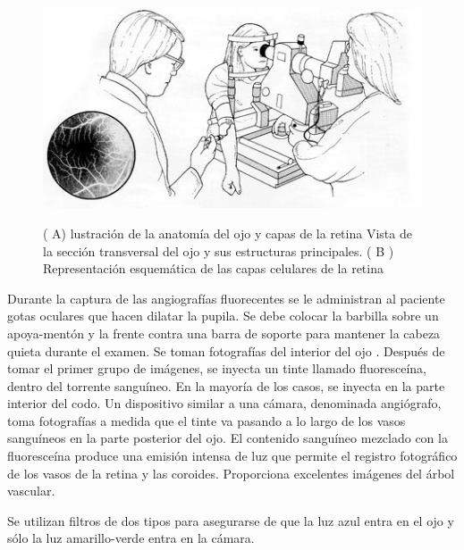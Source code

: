 \begin{figure}[H]
\centering
\includegraphics{./Figures/fluores.jpg}
\label{fig:retina}
\caption{( A) lustración de la anatomía del ojo y capas de la retina  Vista de la sección transversal
del ojo y sus estructuras principales. ( B ) Representación esquemática de las capas celulares de la retina}
\end{figure}


Durante la captura de las angiograf\'ias fluorecentes se le administran al paciente gotas oculares que hacen dilatar la pupila. Se debe colocar la barbilla sobre un apoya-ment\'on y la frente contra una barra de soporte para mantener la cabeza quieta durante el examen. Se toman fotograf\'ias del interior del ojo . Despu\'es de tomar el primer grupo de im\'agenes, se inyecta un tinte llamado fluoresce\'ina, dentro del  torrente sangu\'ineo. En la mayor\'ia de los casos, se inyecta en la parte interior del codo. Un dispositivo similar a una c\'amara, denominada angi\'ografo, toma fotograf\'ias a medida que el tinte va pasando a lo largo de los vasos sangu\'ineos en la parte posterior del ojo. El contenido sangu\'ineo mezclado con la fluoresce\'ina produce una emisi\'on intensa de luz que permite el registro fotogr\'afico de los vasos de la retina y las coroides. Proporciona excelentes im\'agenes del \'arbol vascular.


Se utilizan filtros de dos tipos para asegurarse de que la luz azul entra en el ojo y s\'olo la luz amarillo-verde entra en la c\'amara.

